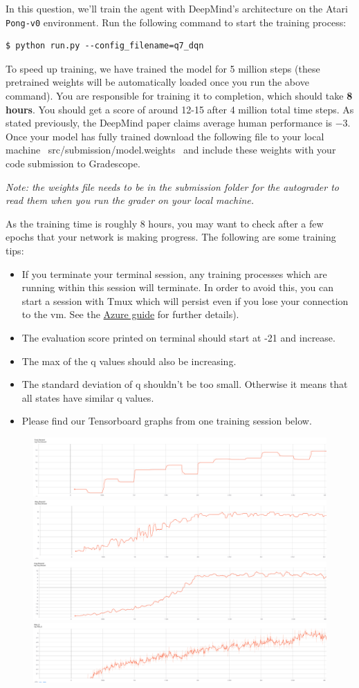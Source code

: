\item {}

In this question, we'll train the agent with DeepMind's architecture on the Atari \texttt{Pong-v0} environment. Run the following command to start the training process:
\begin{lstlisting}
$ python run.py --config_filename=q7_dqn
\end{lstlisting}
To speed up training, we have trained the model for 5 million steps (these pretrained weights will be automatically loaded once you run the above command). You are responsible for training it to completion, which should take \textbf{8 hours}. You should get a score of around 12-15 after 4 million total time steps.  As stated previously, the DeepMind paper claims average human performance is $ -3 $. Once your model has fully trained download the following file to your local machine ~src/submission/model.weights~ and include these weights with your code submission to Gradescope. 

\textit{Note: the weights file needs to be in the submission folder for the autograder to read them when you run the grader on your local machine.}


As the training time is roughly 8 hours, you may want to check after a few epochs that your network is making progress.  The following are some training tips:

\begin{itemize}
\item If you terminate your terminal session, any training processes which are running within this session will terminate.  In order to avoid this, you can start a session with Tmux which will persist even if you lose your connection to the vm. See the \href{https://github.com/scpd-proed/XCS234-Handouts/blob/main/Azure/Azure%20Guide.pdf}{Azure guide} for further details).
\item The evaluation score printed on terminal should start at -21 and increase.
\item The max of the q values should also be increasing.
\item The standard deviation of q shouldn't be too small. Otherwise it means that all states have similar q values.
\item Please find our Tensorboard graphs from one training session below.
\end{itemize}

\begin{figure}[H]
\centering
  \includegraphics[width=.4\linewidth]{images/Eval_R.png}
  \includegraphics[width=.4\linewidth]{images/Max_R.png}
  \includegraphics[width=.4\linewidth]{images/Avg_R.png}
  \includegraphics[width=.4\linewidth]{images/Max_Q.png}
\end{figure}